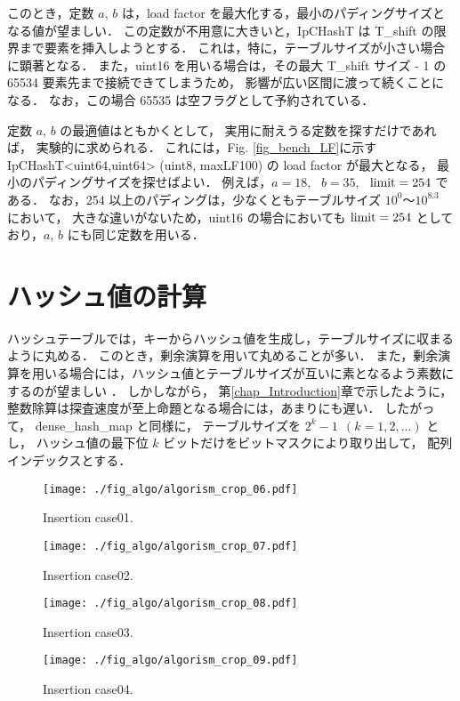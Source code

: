 このとき，定数 $a$, $b$ は，load factor を最大化する，最小のパディングサイズとなる値が望ましい．
この定数が不用意に大きいと，IpCHashT は T\_shift の限界まで要素を挿入しようとする．
これは，特に，テーブルサイズが小さい場合に顕著となる．
また，uint16 を用いる場合は，その最大 T\_shift サイズ - 1 の 65534 要素先まで接続できてしまうため，
影響が広い区間に渡って続くことになる．
なお，この場合 65535 は空フラグとして予約されている．

定数 $a$, $b$ の最適値はともかくとして，
実用に耐えうる定数を探すだけであれば，
実験的に求められる．
これには，Fig. \ref{fig_bench_LF}に示す IpCHashT<uint64,uint64> (uint8, maxLF100) の load factor が最大となる，
最小のパディングサイズを探せばよい．
例えば，$a=18$, \ $b=35$, \ ${\rm limit}=254$ である．
なお，254 以上のパディングは，少なくともテーブルサイズ $10^0〜10^{8.3}$ において，
大きな違いがないため，uint16 の場合においても ${\rm limit}=254$ としており，$a$, $b$ にも同じ定数を用いる．

\section{ハッシュ値の計算}

ハッシュテーブルでは，キーからハッシュ値を生成し，テーブルサイズに収まるように丸める．
このとき，剰余演算を用いて丸めることが多い．
また，剰余演算を用いる場合には，ハッシュ値とテーブルサイズが互いに素となるよう素数にするのが望ましい \citep{石畑1989}．
しかしながら，
第\ref{chap_Introduction}章で示したように，
整数除算は探査速度が至上命題となる場合には，あまりにも遅い．
したがって，
dense\_hash\_map と同様に，
テーブルサイズを $2^k-1\ \ (k=1,2,...)$ とし，
ハッシュ値の最下位 $k$ ビットだけをビットマスクにより取り出して，
配列インデックスとする．


\begin{figure}[h]
  \texttt{[image: ./fig\_algo/algorism\_crop\_06.pdf]}
  \caption{ Insertion case01. }
  \label{fig_IpCHashT_insert_hard_case01}

  \texttt{[image: ./fig\_algo/algorism\_crop\_07.pdf]}
  \caption{ Insertion case02. }
  \label{fig_IpCHashT_insert_hard_case02}

  \texttt{[image: ./fig\_algo/algorism\_crop\_08.pdf]}
  \caption{ Insertion case03. }
  \label{fig_IpCHashT_insert_hard_case03}

  \texttt{[image: ./fig\_algo/algorism\_crop\_09.pdf]}
  \caption{ Insertion case04. }
  \label{fig_IpCHashT_insert_hard_case04}
\end{figure}

